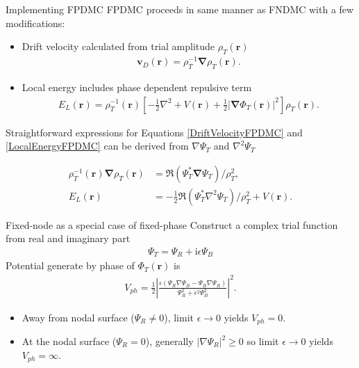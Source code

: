 \documentclass{beamer}
\begin{document}
  \begin{frame}{Implementing FPDMC}
    FPDMC proceeds in same manner as FNDMC with a few modifications:
    \begin{itemize}
      \item{ Drift velocity calculated from trial amplitude $\rho_T(\mathbf{r})$
                \small{\begin{align}
                  \label{DriftVelocityFPDMC}
                  \mathbf{v}_{D}(\mathbf{r}) = \rho_T^{-1} \mathbf{\nabla} \rho_T(\mathbf{r}).
                \end{align}
               }}
      \item{Local energy includes phase dependent repulsive term
                \small{\begin{align}
                  \label{LocalEnergyFPDMC}
                E_{L}(\mathbf{r}) =  \rho_T^{-1}(\mathbf{r}) \left[ -\frac{1}{2} \nabla^2 + V(\mathbf{r})  + \frac{1}{2} | \mathbf{\nabla} \Phi_T \left(\mathbf{r} \right) |^2 \right] \rho_T \left(\mathbf{r}  \right).
               \end{align}
               }}
     \end{itemize}
     Straightforward expressions for Equations \ref{DriftVelocityFPDMC} and \ref{LocalEnergyFPDMC} can be derived from $\nabla \Psi_T$ and $\nabla^2 \Psi_T$
     \begin{center}
               \vspace{-1.em}
               \small{\begin{align}
                  \rho_T^{-1}(\mathbf{r}) \mathbf{\nabla} \rho_T(\mathbf{r}) &= \Re\left( \Psi_T^* \mathbf{\nabla} \Psi_T \right) / \rho_T^2, \\
                   E_{L}(\mathbf{r}) &= - \frac{1}{2}\Re\left( \Psi_T^* \nabla^2 \Psi_T \right) / \rho_T^2 + V(\mathbf{r}).
                \end{align}}
     \end{center}
  \end{frame}
  
  \begin{frame}{Fixed-node as a special case of fixed-phase}
  Construct a complex trial function from real and imaginary part
  \begin{align}
    \Psi_T = \Psi_{R} + \mathrm{i} \epsilon \Psi_{B}
  \end{align}
  Potential generate by phase of $\Phi_T (\mathbf{r})$ is 
  \begin{align}
    V_{ph} = \frac{1}{2} \left| \frac{\epsilon \left( \Psi_R \nabla \Psi_B - \Psi_B \nabla \Psi_R \right)}{\Psi_R^2 + \epsilon^2 \Psi_B^2} \right|^2.
  \end{align}
  \begin{itemize}
  \item Away from nodal surface ($\Psi_R \neq 0$), limit $\epsilon \rightarrow 0$ yields $V_{ph} =0$.
  \item At the nodal surface ($\Psi_R = 0$), generally $\left| \nabla \Psi_R \right|^2 \geq 0$ so limit $\epsilon \rightarrow 0$ yields $V_{ph} = \infty$.
  \end{itemize}
\end{frame}
\end{document}
